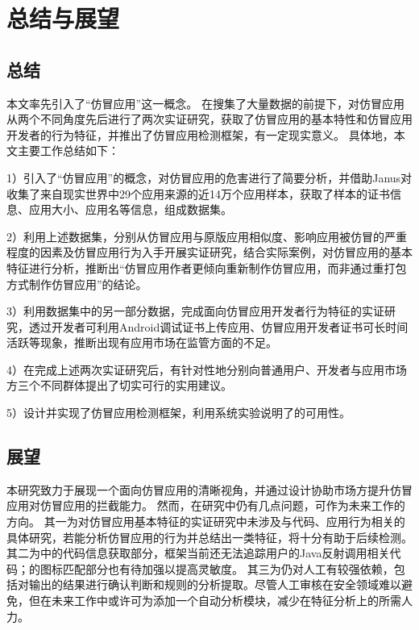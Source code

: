 \chapter{总结与展望}
\label{chp:future}

\section{总结}
本文率先引入了``仿冒应用''这一概念。
在搜集了大量数据的前提下，对仿冒应用从两个不同角度先后进行了两次实证研究，获取了仿冒应用的基本特性和仿冒应用开发者的行为特征，并推出了仿冒应用检测框架\mytool ，有一定现实意义。
具体地，本文主要工作总结如下：

1）引入了``仿冒应用''的概念，对仿冒应用的危害进行了简要分析，并借助Janus对收集了来自现实世界中29个应用来源的近14万个应用样本，获取了样本的证书信息、应用大小、应用名等信息，组成数据集。

2）利用上述数据集，分别从仿冒应用与原版应用相似度、影响应用被仿冒的严重程度的因素及仿冒应用行为入手开展实证研究，结合实际案例，对仿冒应用的基本特征进行分析，推断出``仿冒应用作者更倾向重新制作仿冒应用，而非通过重打包方式制作仿冒应用''的结论。

3）利用数据集中的另一部分数据，完成面向仿冒应用开发者行为特征的实证研究，透过开发者可利用Android调试证书上传应用、仿冒应用开发者证书可长时间活跃等现象，推断出现有应用市场在监管方面的不足。

4）在完成上述两次实证研究后，有针对性地分别向普通用户、开发者与应用市场方三个不同群体提出了切实可行的实用建议。

5）设计并实现了仿冒应用检测框架\mytool ，利用系统实验说明了\mytool 的可用性。


\section{展望}

本研究致力于展现一个面向仿冒应用的清晰视角，并通过设计\mytool 协助市场方提升仿冒应用对仿冒应用的拦截能力。
然而，在研究中仍有几点问题，可作为未来工作的方向。
其一为对仿冒应用基本特征的实证研究中未涉及与代码、应用行为相关的具体研究，若能分析仿冒应用的行为并总结出一类特征，将十分有助于后续检测。
其二为\mytool 中\componentB 的代码信息获取部分，框架当前还无法追踪用户的Java反射调用相关代码；\mytool 的图标匹配部分也有待加强以提高灵敏度。
其三为\mytool 仍对人工有较强依赖，包括对输出的结果进行确认判断和规则的分析提取。尽管人工审核在安全领域难以避免，但在未来工作中或许可为\mytool 添加一个自动分析模块，减少在特征分析上的所需人力。
